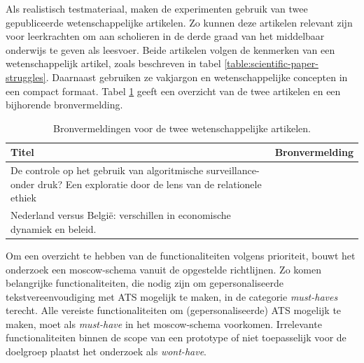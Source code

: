 Als realistisch testmateriaal, maken de experimenten gebruik van twee gepubliceerde wetenschappelijke artikelen. Zo kunnen deze artikelen relevant zijn voor leerkrachten om aan scholieren in de derde graad van het middelbaar onderwijs te geven als leesvoer. Beide artikelen volgen de kenmerken van een wetenschappelijk artikel, zoals beschreven in tabel \ref{table:scientific-paper-struggles}. Daarnaast gebruiken ze vakjargon en wetenschappelijke concepten in een compact formaat. Tabel \ref{table:referentieteksten-bronvermelding} geeft een overzicht van de twee artikelen en een bijhorende bronvermelding.

\begin{center}
	\begin{table}[H]
		\begin{tabular}{ | m{10cm} | m{5cm} | } 
			\hline
			\textbf{Titel} & \textbf{Bronvermelding} \\
			\hline
			De controle op het gebruik van algoritmische surveillance- onder druk? Een exploratie door de lens van de relationele ethiek & \autocite{VanBrakel2022} \\
			\hline
			Nederland versus België: verschillen in economische dynamiek en beleid. & \autocite{Sleuwaegen2022} \\
			\hline
		\end{tabular}
		\caption{Bronvermeldingen voor de twee wetenschappelijke artikelen.}
		\label{table:referentieteksten-bronvermelding}
	\end{table}
\end{center}

Om een overzicht te hebben van de functionaliteiten volgens prioriteit, bouwt het onderzoek een moscow-schema vanuit de opgestelde richtlijnen. Zo komen belangrijke functionaliteiten, die nodig zijn om gepersonaliseerde tekstvereenvoudiging met ATS mogelijk te maken, in de categorie \textit{must-haves} terecht. Alle vereiste functionaliteiten om (gepersonaliseerde) ATS mogelijk te maken, moet als \textit{must-have} in het moscow-schema voorkomen. Irrelevante functionaliteiten binnen de scope van een prototype of niet toepasselijk voor de doelgroep plaatst het onderzoek als \textit{wont-have}.

